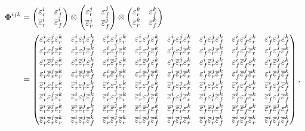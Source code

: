 \begin{align}
  \mathbf{\Phi}^{ijk} &=
  \begin{pmatrix}
  \real^i & \fake^i \\ \realbar^i & \fakebar^i
  \end{pmatrix} 
  \otimes
  \begin{pmatrix}
  \real^j & \fake^j \\ \realbar^j & \fakebar^j
  \end{pmatrix} 
  \otimes
  \begin{pmatrix}
  \real^k & \fake^k \\ \realbar^k & \fakebar^k
  \end{pmatrix} \\
  &=
  \begin{pmatrix} 
  \real^i\real^j\real^k  &
  \real^i\real^j\fake^k  &
  \real^i\fake^j\real^k  &
  \real^i\fake^j\fake^k  &
  \fake^i\real^j\real^k  &
  \fake^i\real^j\fake^k  &
  \fake^i\fake^j\real^k  &
  \fake^i\fake^j\fake^k  \\
  \real^i\real^j\realbar^k  &
  \real^i\real^j\fakebar^k  &
  \real^i\fake^j\realbar^k  &
  \real^i\fake^j\fakebar^k  &
  \fake^i\real^j\realbar^k  &
  \fake^i\real^j\fakebar^k  &
  \fake^i\fake^j\realbar^k  &
  \fake^i\fake^j\fakebar^k  \\
  \real^i\realbar^j\real^k  &
  \real^i\realbar^j\fake^k  &
  \real^i\fakebar^j\real^k  &
  \real^i\fakebar^j\fake^k  &
  \fake^i\realbar^j\real^k  &
  \fake^i\realbar^j\fake^k  &
  \fake^i\fakebar^j\real^k  &
  \fake^i\fakebar^j\fake^k  \\
  \real^i\realbar^j\realbar^k  &
  \real^i\realbar^j\fakebar^k  &
  \real^i\fakebar^j\realbar^k  &
  \real^i\fakebar^j\fakebar^k  &
  \fake^i\realbar^j\realbar^k  &
  \fake^i\realbar^j\fakebar^k  &
  \fake^i\fakebar^j\realbar^k  &
  \fake^i\fakebar^j\fakebar^k  \\
  \realbar^i\real^j\real^k  &
  \realbar^i\real^j\fake^k  &
  \realbar^i\fake^j\real^k  &
  \realbar^i\fake^j\fake^k  &
  \fakebar^i\real^j\real^k  &
  \fakebar^i\real^j\fake^k  &
  \fakebar^i\fake^j\real^k  &
  \fakebar^i\fake^j\fakebar^k  \\
  \realbar^i\real^j\realbar^k  &
  \realbar^i\real^j\fakebar^k  &
  \realbar^i\fake^j\realbar^k  &
  \realbar^i\fake^j\fakebar^k  &
  \fakebar^i\real^j\realbar^k  &
  \fakebar^i\real^j\fakebar^k  &
  \fakebar^i\fake^j\realbar^k  &
  \fakebar^i\fake^j\fakebar^k  \\
  \realbar^i\realbar^j\real^k  &
  \realbar^i\realbar^j\fake^k  &
  \realbar^i\fakebar^j\real^k  &
  \realbar^i\fakebar^j\fake^k  &
  \fakebar^i\realbar^j\real^k  &
  \fakebar^i\realbar^j\fake^k  &
  \fakebar^i\fakebar^j\real^k  &
  \fakebar^i\fakebar^j\fake^k  \\
  \realbar^i\realbar^j\realbar^k  &
  \realbar^i\realbar^j\fakebar^k  &
  \realbar^i\fakebar^j\realbar^k  &
  \realbar^i\fakebar^j\fakebar^k  &
  \fakebar^i\realbar^j\realbar^k  &
  \fakebar^i\realbar^j\fakebar^k  &
  \fakebar^i\fakebar^j\realbar^k  &
  \fakebar^i\fakebar^j\fakebar^k  
  \end{pmatrix} ,
\end{align}
